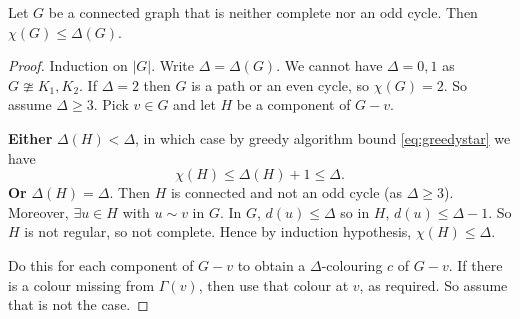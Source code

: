 \documentclass{article}
\begin{document}
\begin{nthm}\label{thm:28}
    Let $G$ be a connected graph that is neither complete nor an odd cycle.
    Then $\chi(G) \leq \Delta(G)$.
\end{nthm}
\begin{proof}
    Induction on $|G|$. Write $\Delta = \Delta(G)$.
    We cannot have $\Delta = 0,1$ as $G \ncong K_1, K_2$.
    If $\Delta = 2$ then $G$ is a path or an even cycle, so $\chi(G) = 2$.
    So assume $\Delta \geq 3$. Pick $v \in G$ and let $H$ be a component of $G - v$.

    \textbf{Either} $\Delta(H) < \Delta$, in which case by greedy algorithm bound \eqref{eq:greedystar} we have \begin{equation*}\chi(H) \leq \Delta(H) + 1 \leq \Delta.\end{equation*}
    \textbf{Or} $\Delta(H) = \Delta$. Then $H$ is connected and not an odd cycle (as $\Delta \geq 3$).
    Moreover, $\exists u \in H$ with $u \sim v$ in $G$.
    In $G$, $d(u) \leq \Delta$ so in $H$, $d(u) \leq \Delta - 1$.
    So $H$ is not regular, so not complete.
    Hence by induction hypothesis, $\chi(H) \leq \Delta$.

    Do this for each component of $G - v$ to obtain a $\Delta$-colouring $c$ of $G - v$.
    If there is a colour missing from $\Gamma(v)$, then use that colour at $v$, as required.
    So assume that is not the case.


\end{proof}
\end{document}
